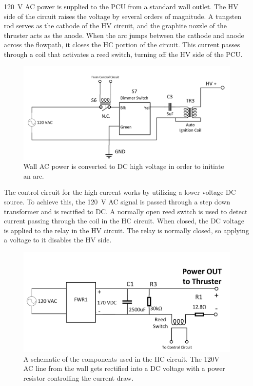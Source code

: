 \documentclass[journal]{IEEEtran}
\begin{document}
\SI{120}{\volt} AC power is supplied to the PCU from a standard wall outlet.
The HV side of the circuit raises the voltage by several orders of magnitude.
A tungsten rod serves as the cathode of the HV circuit, and the graphite nozzle of the thruster acts as the anode.  When the arc jumps between the cathode and anode across the flowpath, it closes the HC portion of the circuit.
This current passes through a coil that activates a reed switch, turning off the HV side of the PCU.\@

\begin{figure}[htp]
  \includegraphics[width=\linewidth]{figs/hv-schematic.png}
  \caption{Wall AC power is converted to DC high voltage in order to initiate an arc.
\label{fig:hv-circuit}
}
\end{figure}

The control circuit for the high current works by utilizing a lower voltage DC source.
To achieve this, the \SI{120}{\volt} AC signal is passed through a step down transformer and is rectified to DC.\@
A normally open reed switch is used to detect current passing through the coil in the HC circuit.
When closed, the DC voltage is applied to the relay in the HV circuit.
The relay is normally closed, so applying a voltage to it disables the HV side.

\begin{figure}[htp]
  \includegraphics[width=\linewidth]{figs/hc-schematic.png}
  \caption{A schematic of the components used in the HC circuit.
  The 120V AC line from the wall gets rectified into a DC voltage with a power resistor controlling the current draw.
\label{fig:hc-circuit}
}
\end{figure}
\end{document}
